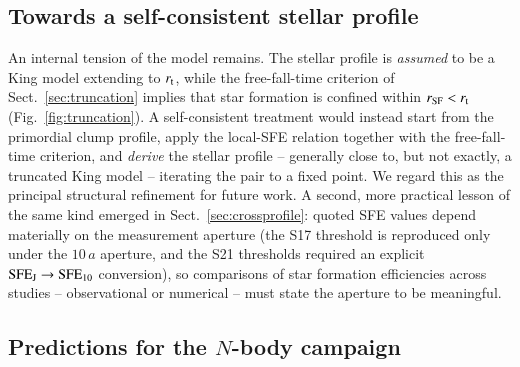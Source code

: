 \documentclass{aa}
\newcommand{\sfe}{{\rm SFE}}
\newcommand{\rtid}{r_{\rm t}}
\newcommand{\rsf}{r_{\rm SF}}
\begin{document}
\subsection{Towards a self-consistent stellar profile}
\label{sec:disc_selfcons}

An internal tension of the model remains. The stellar profile is
\emph{assumed} to be a King model extending to $\rtid$, while the
free-fall-time criterion of Sect.~\ref{sec:truncation} implies that star
formation is confined within $\rsf<\rtid$ (Fig.~\ref{fig:truncation}). A
self-consistent treatment would instead start from the primordial clump
profile, apply the local-SFE relation together with the free-fall-time
criterion, and \emph{derive} the stellar profile -- generally close to,
but not exactly, a truncated King model -- iterating the pair to a fixed
point. We regard this as the principal structural refinement for future
work. A second, more practical lesson of the same kind emerged in
Sect.~\ref{sec:crossprofile}: quoted SFE values depend materially on the
measurement aperture (the S17 threshold is reproduced only under the
$10\,a$ aperture, and the S21 thresholds required an explicit
$\sfe_{\rm J}\rightarrow\sfe_{10}$ conversion), so comparisons of star
formation efficiencies across studies -- observational or numerical --
must state the aperture to be meaningful.

\subsection{Predictions for the $N$-body campaign}
\label{sec:disc_predictions}
\end{document}
